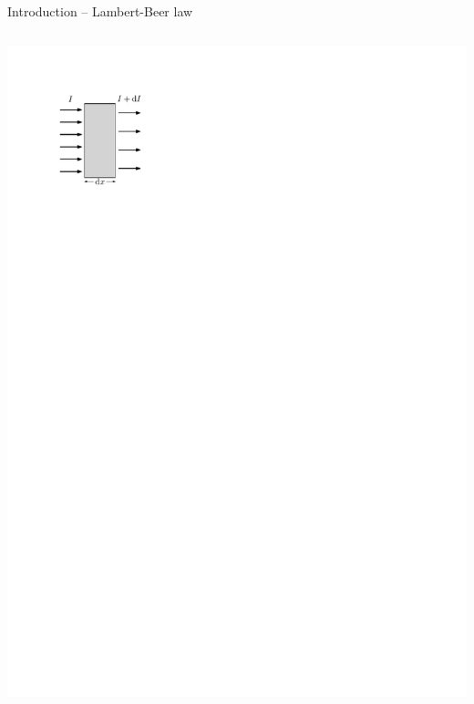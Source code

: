 \documentclass[11pt,xcolor=dvipsnames,professionalfonts,notes]{beamer}
\begin{document}
\begin{frame}{Introduction -- Lambert-Beer law}
\begin{columns}
			\begin{center}
				\includegraphics{./figures/lambert_beer.pdf}
			\end{center}			
	\end{columns}
\end{frame}

\end{document}
